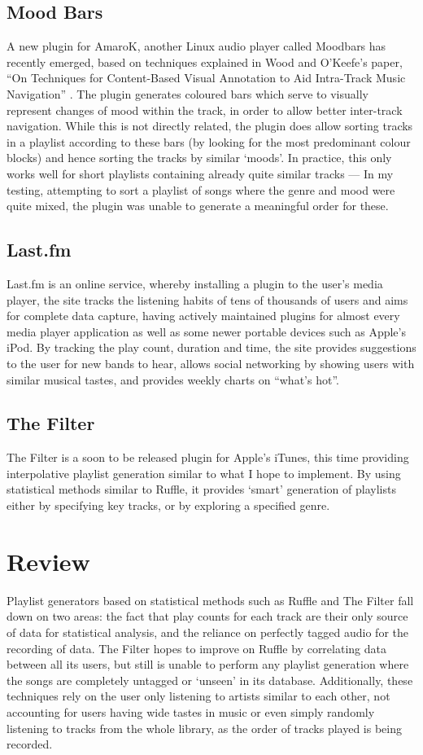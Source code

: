 \subsection{Mood Bars}
A new plugin for AmaroK, another Linux audio player called Moodbars has recently emerged, based on techniques explained in Wood and O'Keefe's paper, ``On Techniques for Content-Based Visual Annotation to Aid Intra-Track Music Navigation'' \citep{Wood2005}. The plugin generates coloured bars which serve to visually represent changes of mood within the track, in order to allow better inter-track navigation. While this is not directly related, the plugin does allow sorting tracks in a playlist according to these bars (by looking for the most predominant colour blocks) and hence sorting the tracks by similar ‘moods’. In practice, this only works well for short playlists containing already quite similar tracks --- In my testing, attempting to sort a playlist of songs where the genre and mood were quite mixed, the plugin was unable to generate a meaningful order for these.
\subsection{Last.fm}
Last.fm is an online service, whereby installing a plugin to the user's media player, the site tracks the listening habits of tens of thousands of users and aims for complete data capture, having actively maintained plugins for almost every media player application as well as some newer portable devices such as Apple's iPod. By tracking the play count, duration and time, the site provides suggestions to the user for new bands to hear, allows social networking by showing users with similar musical tastes, and provides weekly charts on ``what's hot''.
\subsection{The Filter}
The Filter is a soon to be released plugin for Apple's iTunes, this time providing interpolative playlist generation similar to what I hope to implement. By using statistical methods similar to Ruffle, it provides `smart' generation of playlists either by specifying key tracks, or by exploring a specified genre.
\section{Review}
Playlist generators based on statistical methods such as Ruffle and The Filter fall down on two areas: the fact that play counts for each track are their only source of data for statistical analysis, and the reliance on perfectly tagged audio for the recording of data. The Filter hopes to improve on Ruffle by correlating data between all its users, but still is unable to perform any playlist generation where the songs are completely untagged or `unseen' in its database. Additionally, these techniques rely on the user only listening to artists similar to each other, not accounting for users having wide tastes in music or even simply randomly listening to tracks from the whole library, as the order of tracks played is being recorded.

